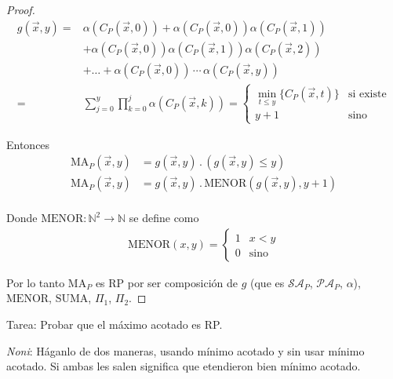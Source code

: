 \begin{proof} \phantom{.}

    \begin{align*}
        g(\overrightarrow{x},y) =& \alpha(C_P(\overrightarrow{x},0)) 
        + \alpha(C_P(\overrightarrow{x}, 0)) \alpha(C_P(\overrightarrow{x},1))
        \\
        &+ \alpha(C_P(\overrightarrow{x},0)) \alpha(C_P(\overrightarrow{x},1))
          \alpha(C_P(\overrightarrow{x},2)) \\
        &+ \dots
        + \alpha(C_P(\overrightarrow{x},0)) \, \cdots \, 
          \alpha(C_P(\overrightarrow{x},y)) \\
        =& \sum_{j=0}^{y} \prod_{k=0}^{j} \alpha(C_P(\overrightarrow{x},k))
        = \begin{cases}
            \min_{t \leq y}{\{ C_P (\overrightarrow{x},t) \}} & \text{si 
            existe} \\
            y+1 & \text{sino}
        \end{cases}
    \end{align*}

    Entonces
    \begin{align*}
        \mathrm{MA}_P (\overrightarrow{x},y) 
        &= g(\overrightarrow{x},y) \, . \, (g(\overrightarrow{x},y) \leq y) \\
        \mathrm{MA}_P (\overrightarrow{x},y) 
        &= g(\overrightarrow{x},y) \, . \, \mathrm{MENOR}(g(\overrightarrow{x},y) , y+1) \\
    \end{align*}

    Donde $\mathrm{MENOR}: \mathbb{N}^2 \to \mathbb{N}$ se define como
    \begin{gather*}
        \mathrm{MENOR} (x,y) =
        \begin{cases}
            1 & x < y \\
            0 & \text{sino}
        \end{cases}
    \end{gather*}

    Por lo tanto $\mathrm{MA}_P$ es RP por ser composición de $g$ (que es $\mathcal{SA}_P$, $\mathcal{PA}_P$,
    $\alpha$), $\mathrm{MENOR}$, $\mathrm{SUMA}$, $\Pi_1$, $\Pi_2$.
\end{proof}

\bigskip

Tarea: Probar que el máximo acotado es RP.

\textit{Noni}: Háganlo de dos maneras, usando mínimo acotado y sin usar
mínimo acotado. Si ambas les salen significa que etendieron bien mínimo 
acotado.

